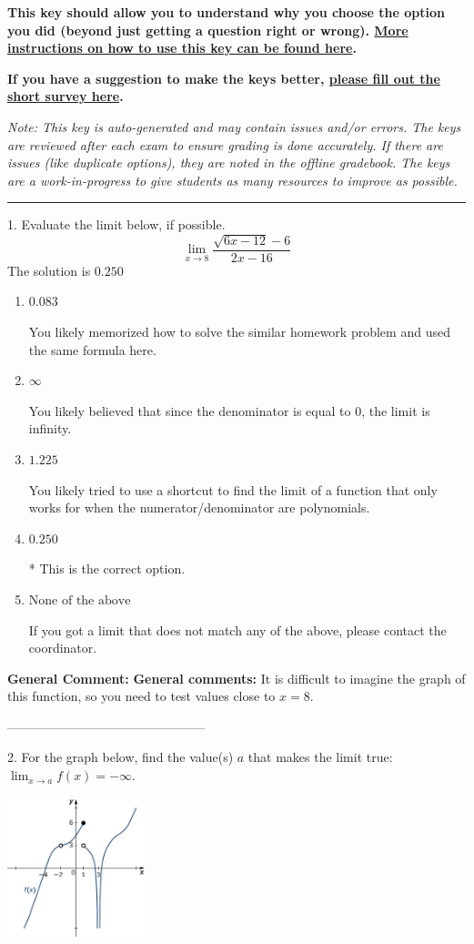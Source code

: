 \documentclass{extbook}[14pt]
\begin{document}
\textbf{This key should allow you to understand why you choose the option you did (beyond just getting a question right or wrong). \href{https://xronos.clas.ufl.edu/mac1105spring2020/courseDescriptionAndMisc/Exams/LearningFromResults}{More instructions on how to use this key can be found here}.}

\textbf{If you have a suggestion to make the keys better, \href{https://forms.gle/CZkbZmPbC9XALEE88}{please fill out the short survey here}.}

\textit{Note: This key is auto-generated and may contain issues and/or errors. The keys are reviewed after each exam to ensure grading is done accurately. If there are issues (like duplicate options), they are noted in the offline gradebook. The keys are a work-in-progress to give students as many resources to improve as possible.}

\rule{\textwidth}{0.4pt}

1. Evaluate the limit below, if possible.
\[ \lim_{x \rightarrow 8} \frac{\sqrt{6x - 12} - 6}{2x - 16} \] 
The solution is $ 0.250 $ 

\begin{enumerate}[label=\Alph*.] 
\item $ 0.083 $ 

 You likely memorized how to solve the similar homework problem and used the same formula here. 
\item $ \infty $ 

 You likely believed that since the denominator is equal to 0, the limit is infinity. 
\item $ 1.225 $ 

 You likely tried to use a shortcut to find the limit of a function that only works for when the numerator/denominator are polynomials. 
\item $ 0.250 $ 

 * This is the correct option. 
\item $ \text{None of the above} $ 

 If you got a limit that does not match any of the above, please contact the coordinator. 
\end{enumerate} 
 
\textbf{General Comment:} \textbf{General comments:} It is difficult to imagine the graph of this function, so you need to test values close to $x = 8$. 

-----------------------------------------------

2. For the graph below, find the value(s) $a$ that makes the limit true: $ \displaystyle \lim_{x \rightarrow a} f(x) = -\infty$.
\begin{center} \includegraphics[width=0.3\textwidth]{../Figures/evaluateLimitGraphicallyB.png} \end{center} 
\end{document}
